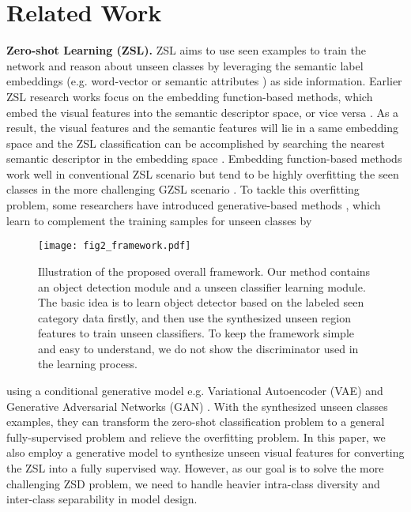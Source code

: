 \documentclass[10pt,twocolumn,letterpaper]{article}
\begin{document}
\section{Related Work}
\label{sec:formatting}
\textbf{Zero-shot Learning (ZSL).} ZSL aims to use seen examples to train the network and reason about unseen classes by leveraging the semantic label embeddings (e.g. word-vector \cite{mikolov2013distributed} or semantic attributes \cite{akata2015evaluation}) as side information. Earlier ZSL research works focus on the embedding function-based methods, which embed the visual features into the semantic descriptor space, or vice versa \cite{akata2013label, fu2014transductive, bucher2016improving, kodirov2017semantic}. As a result, the visual features and the semantic features will lie in a same embedding space and the ZSL classification can be accomplished by searching the nearest semantic descriptor in the embedding space \cite{han2020learning}. Embedding function-based methods work well in conventional ZSL scenario \cite{akata2013label, bucher2016improving, xian2016latent, fu2015zero} but tend to be highly overfitting the seen classes in the more challenging GZSL scenario \cite{han2020learning, chen2021free, verma2018generalized, xian2018feature}. To tackle this overfitting problem, some researchers have introduced generative-based methods \cite{schonfeld2019generalized, kingma2013auto, han2020learning, chen2021free}, which learn to complement the training samples for unseen classes by
\begin{figure*}[t]
  \centering
  	\vspace{1.8mm}
\texttt{[image: fig2\_framework.pdf]}
   \caption{Illustration of the proposed overall framework. Our method contains an object detection  module and a unseen classifier learning module. The basic idea is to learn object detector based on the labeled seen category data firstly, and then use the synthesized unseen region features to train unseen classifiers. To keep the framework simple and easy to understand, we do not show the discriminator used in the learning process.}
   \label{framwork}
   	\vspace{-3mm}
\end{figure*}
using a conditional generative model e.g. Variational Autoencoder (VAE) \cite{kingma2013auto} and Generative Adversarial Networks (GAN) \cite{xian2019f}. With the synthesized unseen classes examples, they can transform the zero-shot classification problem to a general fully-supervised problem and relieve the overfitting problem. In this paper, we also employ a generative model to synthesize unseen visual features for converting the ZSL into a fully supervised way. However, as our goal is to solve the more challenging ZSD problem, we need to handle heavier intra-class diversity and inter-class separability in model design.
\end{document}
